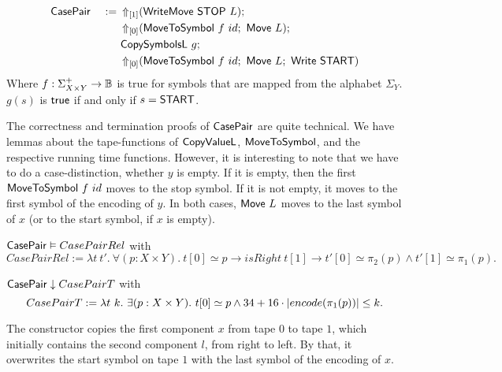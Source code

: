 %
\begin{definition}[$\MS{CasePair}$][CasePair]
  \label{def:CasePair}
  ~
  \begin{alignat*}{2}
    &\MS{CasePair}&~:=~& \LiftTapes{(\MS{WriteMove}~\MS{STOP}~L)}{\Vector{1}} \Seq \\
    &              &    & \LiftTapes{(\MS{MoveToSymbol}~f~id \Seq \MS{Move}~L)}{\Vector{0}} \Seq \\
    &              &    & \MS{CopySymbolsL}~g\Seq \\
    &              &    & \LiftTapes{(\MS{MoveToSymbol}~f~id \Seq \MS{Move}~L \Seq \MS{Write}~\MS{START})}{\Vector{0}}
  \end{alignat*}
  Where $f : \Sigma_{X \times Y}^+ \to \Bool$ is true for symbols that are mapped from the alphabet $\Sigma_Y$.  $g(s)$ is $\true$ if and only if
  $s=\MS{START}$.
\end{definition}

The correctness and termination proofs of $\MS{CasePair}$ are quite technical.  We have lemmas about the tape-functions of $\MS{CopyValueL}$,
$\MS{MoveToSymbol}$, and the respective running time functions.  However, it is interesting to note that we have to do a case-distinction, whether $y$
is empty.  If it is empty, then the first $\MS{MoveToSymbol}~f~id$ moves to the stop symbol.  If it is not empty, it moves to the first symbol of the
encoding of $y$.  In both cases, $\MS{Move}~L$ moves to the last symbol of $x$ (or to the start symbol, if $x$ is empty).

\begin{lemma}
  \label{lem:CasePair_Realise}
  $\MS{CasePair} \Realise CasePairRel$ with
  \small
  \[
    CasePairRel := \lambda t~t'.~\forall (p: X \times Y).~t[0] \simeq p \rightarrow isRight~t[1] \rightarrow t'[0] \simeq \pi_2(p) \land t'[1] \simeq \pi_1(p).
  \]
\end{lemma}
\begin{lemma}
  \label{lem:CasePair_TerminatesIn}
  $\MS{CasePair} \TerminatesIn CasePairT$ with
  \[
    CasePairT := \lambda t~k.~\exists (p: X \times Y).~t[0] \simeq p \land 34 + 16 \cdot \size{\pi_1(p)} \leq k.
  \]
\end{lemma}

The constructor copies the first component $x$ from tape $0$ to tape $1$, which initially contains the second component $l$, from right to left.  By
that, it overwrites the start symbol on tape $1$ with the last symbol of the encoding of $x$.

